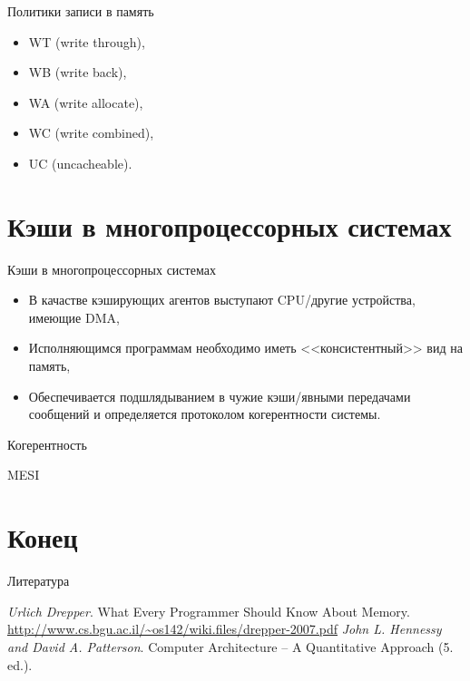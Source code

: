 \begin{frame}{Политики записи в память}
\begin{itemize}
    \item WT (write through),
    \item WB (write back),
    \item WA (write allocate),
    \item WC (write combined),
    \item UC (uncacheable).
\end{itemize}
\end{frame}

\section{Кэши в многопроцессорных системах}

\begin{frame}{Кэши в многопроцессорных системах}
\begin{itemize}
    \item В качастве кэширующих агентов выступают CPU/другие устройства, имеющие DMA,
    \item Исполняющимся программам необходимо иметь <<консистентный>> вид на память,
    \item Обеспечивается подшлядыванием в чужие кэши/явными передачами
    сообщений и определяется протоколом когерентности системы.
\end{itemize}
\end{frame}

\begin{frame}{Когерентность}
\todo
\end{frame}

\begin{frame}{MESI}
\end{frame}

\section*{Конец}

\begin{frame}[allowframebreaks]{Литература}
\begin{thebibliography}{99}
     \textit{Urlich Drepper}. What Every Programmer
    Should Know About Memory.
    \url{http://www.cs.bgu.ac.il/~os142/wiki.files/drepper-2007.pdf}
     \textit{John L. Hennessy and David A. Patterson}.
    Computer Architecture -- A Quantitative Approach (5. ed.).
\end{thebibliography}
\end{frame}

